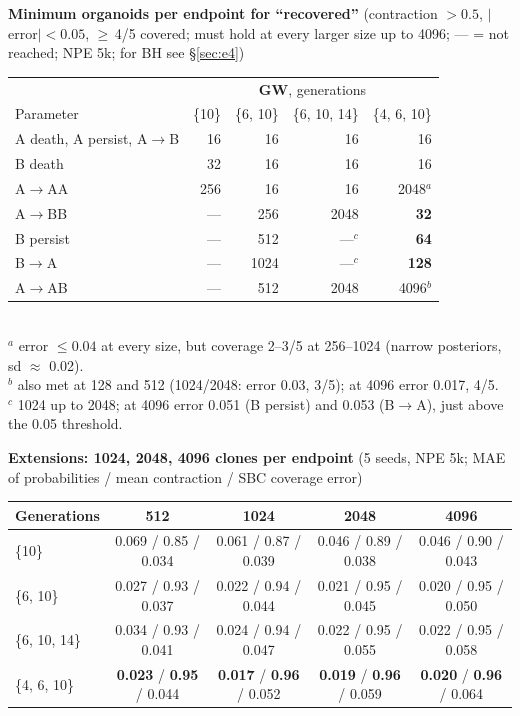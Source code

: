 \documentclass[10pt,a4paper]{article}
\begin{document}
\begin{center}\footnotesize
\textbf{Minimum organoids per endpoint for ``recovered''} (contraction $>0.5$, $|$error$|<0.05$, $\ge$\,4/5 covered; must hold at every larger size up to 4096; --- = not reached; NPE 5k; for BH see \S\ref{sec:e4})\\[2pt]
\begin{tabular}{@{}lrrrr@{}}\toprule
 & \multicolumn{4}{c}{\textbf{GW}, generations} \\
Parameter & \{10\} & \{6, 10\} & \{6, 10, 14\} & \{4, 6, 10\} \\\midrule
A death, A persist, A$\to$B & 16 & 16 & 16 & 16 \\
B death & 32 & 16 & 16 & 16 \\
A$\to$AA & 256 & 16 & 16 & 2048$^a$ \\
A$\to$BB & --- & 256 & 2048 & \textbf{32} \\
B persist & --- & 512 & ---$^c$ & \textbf{64} \\
B$\to$A & --- & 1024 & ---$^c$ & \textbf{128} \\
A$\to$AB & --- & 512 & 2048 & 4096$^b$ \\\bottomrule
\end{tabular}\\[1pt]
$^a$ error $\le 0.04$ at every size, but coverage 2--3/5 at 256--1024 (narrow posteriors, sd $\approx$ 0.02).\\
$^b$ also met at 128 and 512 (1024/2048: error 0.03, 3/5); at 4096 error 0.017, 4/5.\\
$^c$ 1024 up to 2048; at 4096 error 0.051 (B persist) and 0.053 (B$\to$A), just above the 0.05 threshold.

\medskip\textbf{Extensions: 1024, 2048, 4096 clones per endpoint} (5 seeds, NPE 5k; MAE of probabilities / mean contraction / SBC coverage error)\\[2pt]
\setlength{\tabcolsep}{4pt}
\begin{tabular}{@{}lcccc@{}}\toprule
Generations & 512 & 1024 & 2048 & 4096 \\\midrule
\{10\} & 0.069 / 0.85 / 0.034 & 0.061 / 0.87 / 0.039 & 0.046 / 0.89 / 0.038 & 0.046 / 0.90 / 0.043 \\
\{6, 10\} & 0.027 / 0.93 / 0.037 & 0.022 / 0.94 / 0.044 & 0.021 / 0.95 / 0.045 & 0.020 / 0.95 / 0.050 \\
\{6, 10, 14\} & 0.034 / 0.93 / 0.041 & 0.024 / 0.94 / 0.047 & 0.022 / 0.95 / 0.055 & 0.022 / 0.95 / 0.058 \\
\{4, 6, 10\} & \textbf{0.023} / \textbf{0.95} / 0.044 & \textbf{0.017} / \textbf{0.96} / 0.052 & \textbf{0.019} / \textbf{0.96} / 0.059 & \textbf{0.020} / \textbf{0.96} / 0.064 \\\bottomrule
\end{tabular}
\setlength{\tabcolsep}{6pt}
\end{center}
\end{document}
